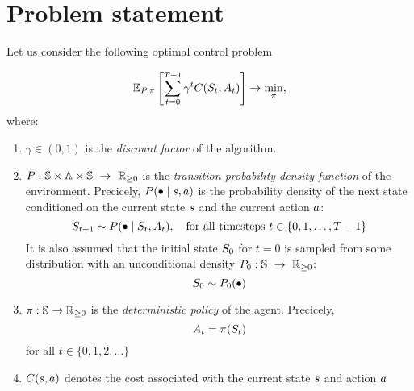 \documentclass[12pt,twoside]{../../mitthesis}
\begin{document}
\section*{Problem statement}
Let us consider the following optimal control problem

\begin{equation}
    \label{eqn_ddpg_problem}
    \E[\transit, \policy]{\sum_{t = 0}^{T-1} \gamma ^ t \Cost(\State_{t}, \Action_{t})} \ra \min_{\policy},
\end{equation}
where:
\begin{enumerate}
    \item $\gamma \in (0, 1)$ is the \textit{discount factor} of the algorithm. 
    \item  $P : \mathbb S \times \mathbb A \times \mathbb S \ \rightarrow \ {\mathbb{R}}_{\geq 0}$ is the \textit{transition probability density function} of the environment. Precicely,  $P(\bullet \mid s, a)$ is the probability density of the next state conditioned on the current state $s$ and the current action $a$:
    $$
        S_{t+1} \sim P(\bullet \mid S_t, A_t), \quad \text{for all timesteps } t \in \{0, 1, \dots, T-1\} 
    $$
    It is also assumed that the initial state $S_0$ for $t = 0$ is sampled from some distribution with an unconditional density $P_0 : \mathbb S \ \rightarrow \ {\mathbb{R}}_{\geq 0}$:
    $$
        S_0 \sim P_0(\bullet)
    $$
    \item $\pi:  \mathbb S \rightarrow {\mathbb{R}}_{\geq 0}$ is the \textit{deterministic policy} of the agent. Precicely,
    $$
        A_t  = \pi(S_t)
    $$
    for all $t \in \{0, 1, 2, \dots\}$
    \item $C(s, a)$ denotes the cost associated with the current state $s$ and action $a$
\end{enumerate}
\end{document}
